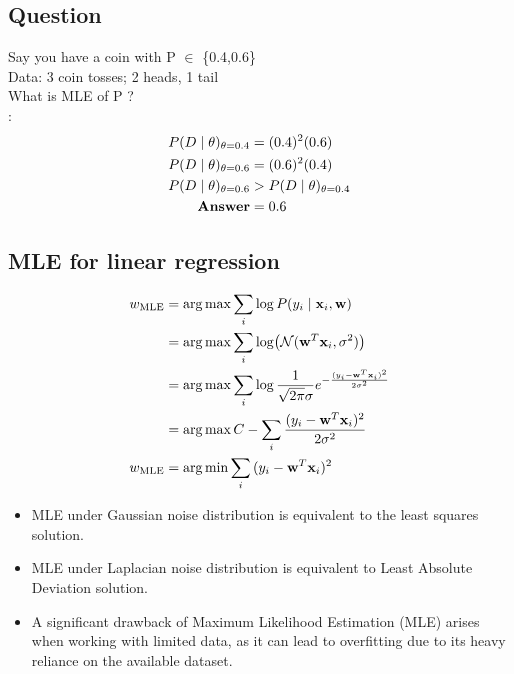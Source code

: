 \subsection{Question}
Say you have a coin with P $\in$ \{0.4,0.6\} \\
Data: 3 coin tosses; 2 heads, 1 tail \\
What is MLE of P ? \\

:
\begin{align*}
  P(D\mid\theta)_{\theta = 0.4} & = (0.4)^2 (0.6)                 \\
  P(D\mid\theta)_{\theta = 0.6} & = (0.6)^2 (0.4)                 \\
  P(D\mid\theta)_{\theta = 0.6} & > P(D\mid\theta)_{\theta = 0.4} \\
  \textbf{Answer}                   & = 0.6
\end{align*}

\subsection{MLE for linear regression}
\begin{align*}
  w_{\text{MLE}} & = \operatorname*{arg\,max} \sum_i \log P(y_i \mid \mathbf{x}_i, \mathbf{w})                                                  \\
                 & = \operatorname*{arg\,max} \sum_i \log ( \mathcal{N}(\mathbf{w}^T\mathbf{x}_i, \sigma^2))                                    \\
                 & = \operatorname*{arg\,max} \sum_i \log \frac{1}{\sqrt{2\pi}\sigma} e^{-\frac{(y_i - \mathbf{w}^T\mathbf{x}_i)^2}{2\sigma^2}} \\
                 & = \operatorname*{arg\,max} C - \sum_i {\frac{(y_i - \mathbf{w}^T\mathbf{x}_i)^2}{2\sigma^2}}                                 \\
  w_{\text{MLE}} & = \operatorname*{arg\,min} \sum_i {(y_i - \mathbf{w}^T\mathbf{x}_i)^2}
\end{align*}

\begin{itemize}
  \item MLE under Gaussian noise distribution is equivalent to the least squares solution.
  \item MLE under Laplacian noise distribution is equivalent to Least Absolute Deviation solution.
  \item A significant drawback of Maximum Likelihood Estimation (MLE) arises when working with limited data, as it can lead to overfitting due to its heavy reliance on the available dataset.
\end{itemize}

